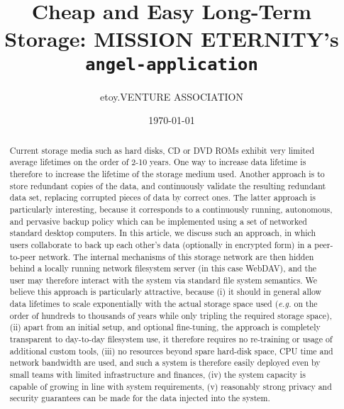 \documentclass[11pt]{article}
\title{Cheap and Easy Long-Term Storage: MISSION ETERNITY's \texttt{angel-application}}
\author{etoy.VENTURE ASSOCIATION}
\date{\today}                                           %
\begin{document}
\maketitle
\begin{frontmatter}

\begin{abstract}
Current storage media such as hard disks, CD or DVD ROMs exhibit very limited average lifetimes on the order of 2-10 years. One way to increase data lifetime is therefore to increase the lifetime of the storage medium used. Another approach is to store redundant copies of the data, and continuously validate the resulting redundant data set, replacing corrupted pieces of data by correct ones.
The latter approach is particularly interesting, because it corresponds to a continuously running, autonomous, and pervasive backup policy which can be implemented using a set of networked standard desktop computers. In this article, we discuss such an approach, in which users collaborate to back up each other's data (optionally in encrypted form) in a peer-to-peer network. The internal mechanisms of this storage network are then hidden behind a locally running network filesystem server (in this case WebDAV), and the user may therefore interact with the system via standard file system semantics. We believe this approach is particularly attractive, because (i) it should in general allow data lifetimes to scale exponentially with the actual storage space used (\emph{e.g.} on the order of hundreds to thousands of years while only tripling the required storage space), (ii) apart from an initial setup, and optional fine-tuning, the approach is completely transparent to day-to-day filesystem use, it therefore requires no re-training or usage of additional custom tools, (iii) no resources beyond spare hard-disk space, CPU time and network bandwidth are used, and such a system is therefore easily deployed even by small teams with limited infrastructure and finances, (iv) the system capacity is capable of growing in line with system requirements, (v) reasonably strong privacy and security guarantees can be made for the data injected into the system.
\end{abstract}

\newpage

\tableofcontents


\end{frontmatter}
\newpage
\end{document}
